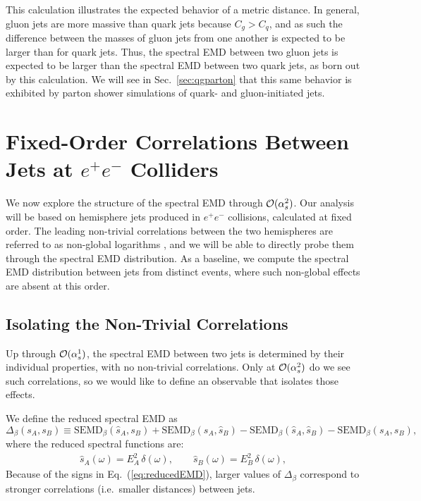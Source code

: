 \documentclass[letterpaper,11pt]{article}
\DeclareRobustCommand{\Sec}[1]{Sec.~\ref{#1}}
\DeclareRobustCommand{\Eq}[1]{Eq.~(\ref{#1})}
\begin{document}
This calculation illustrates the expected behavior of a metric distance.  
%
In general, gluon jets are more massive than quark jets because $C_g>C_q$, and as such the difference between the masses of gluon jets from one another is expected to be larger than for quark jets.  
%
Thus, the spectral EMD between two gluon jets is expected to be larger than the spectral EMD between two quark jets, as born out by this calculation.  
%
We will see in \Sec{sec:qgparton} that this same behavior is exhibited by parton shower simulations of quark- and gluon-initiated jets.


\section{Fixed-Order Correlations Between Jets at $e^+e^-$ Colliders}
\label{sec:fixedorder}

We now explore the structure of the spectral EMD through ${\cal O}(\alpha_s^2)$.
%
Our analysis will be based on hemisphere jets produced in $e^+e^-$ collisions, calculated at fixed order.
%
The leading non-trivial correlations between the two hemispheres are referred to as non-global logarithms \cite{Dasgupta:2001sh}, and we will be able to directly probe them through the spectral EMD distribution.
%
As a baseline, we compute the spectral EMD distribution between jets from distinct events, where such non-global effects are absent at this order.


\subsection{Isolating the Non-Trivial Correlations}

Up through ${\cal O}(\alpha_s^1)$, the spectral EMD between two jets is determined by their individual properties, with no non-trivial correlations.
%
Only at ${\cal O}(\alpha_s^2)$ do we see such correlations, so we would like to define an observable that isolates those effects.


We define the reduced spectral EMD as
%
\begin{equation}
\label{eq:reducedEMD}
\Delta_\beta(s_A, s_B) \equiv\text{SEMD}_\beta(\hat{s}_A, s_B) + \text{SEMD}_\beta(s_A, \hat{s}_B) - \text{SEMD}_\beta(\hat{s}_A, \hat{s}_B) - \text{SEMD}_\beta(s_A, s_B),
\end{equation}
%
where the reduced spectral functions are:
%
\begin{align}
\hat{s}_A(\omega) = E^2_A \, \delta(\omega), \qquad \hat{s}_B(\omega) = E^2_B \, \delta(\omega),
\end{align}
%
Because of the signs in \Eq{eq:reducedEMD}, larger values of $\Delta_\beta$ correspond to stronger correlations (i.e.~smaller distances) between jets. 
\end{document}
